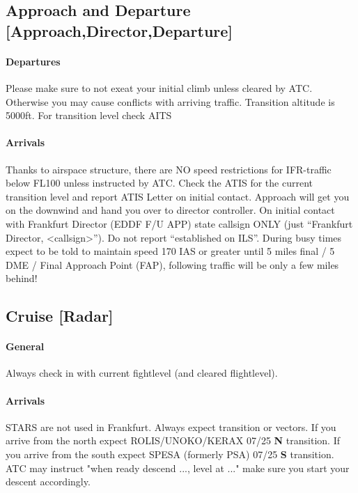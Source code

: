 \subsection[APP]{Approach and Departure [Approach,Director,Departure]}
\paragraph{Departures}
Please make sure to not exeat your initial climb unless cleared by ATC.
Otherwise you may cause conflicts with arriving traffic.
Transition altitude is 5000ft. For transition level check AITS

\paragraph{Arrivals}
Thanks to airspace structure, there are NO speed restrictions for IFR-traffic below FL100 unless
instructed by ATC.
Check the ATIS for the current transition level and report ATIS Letter on initial contact.
Approach will get you on the downwind and hand you over to director controller.
On initial contact with Frankfurt Director (EDDF F/U APP) state callsign ONLY (just “Frankfurt Director, <callsign>”).
Do not report “established on ILS”. During busy times expect to be told to maintain speed 170 IAS or greater until 5 miles final / 5 DME / Final Approach Point (FAP), following traffic will be only a few miles behind! 

\subsection[CTR]{Cruise [Radar]}
\paragraph{General}
Always check in with current fightlevel (and cleared flightlevel).

\paragraph{Arrivals}
STARS are not used in Frankfurt. Always expect transition or vectors.
If you arrive from the north expect ROLIS/UNOKO/KERAX 07/25 \textbf{N} transition.
If you arrive from the south expect SPESA (formerly PSA) 07/25 \textbf{S} transition.
ATC may instruct "when ready descend ..., level at ..." make sure you start your descent accordingly.
